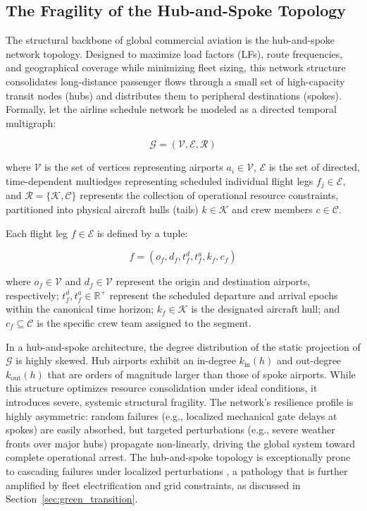 \documentclass[11pt,a4paper]{book}
\begin{document}
\subsection{The Fragility of the Hub-and-Spoke Topology}\label{sec:hub_and_spoke}

The structural backbone of global commercial aviation is the hub-and-spoke network topology. Designed to maximize load factors (LFs), route frequencies, and geographical coverage while minimizing fleet sizing, this network structure consolidates long-distance passenger flows through a small set of high-capacity transit nodes (hubs) and distributes them to peripheral destinations (spokes). Formally, let the airline schedule network be modeled as a directed temporal multigraph:

\begin{equation}
\mathcal{G} = \left(\mathcal{V}, \mathcal{E}, \mathcal{R}\right)
\end{equation}

where $\mathcal{V}$ is the set of vertices representing airports $a_i \in \mathcal{V}$, $\mathcal{E}$ is the set of directed, time-dependent multiedges representing scheduled individual flight legs $f_j \in \mathcal{E}$, and $\mathcal{R} = \{\mathcal{K}, \mathcal{C}\}$ represents the collection of operational resource constraints, partitioned into physical aircraft hulls (tails) $k \in \mathcal{K}$ and crew members $c \in \mathcal{C}$.

Each flight leg $f \in \mathcal{E}$ is defined by a tuple:

\begin{equation}
f = \left(o_f, d_f, t_f^d, t_f^a, k_f, c_f\right)
\end{equation}

where $o_f \in \mathcal{V}$ and $d_f \in \mathcal{V}$ represent the origin and destination airports, respectively; $t_f^d, t_f^a \in \mathbb{R}^+$ represent the scheduled departure and arrival epochs within the canonical time horizon; $k_f \in \mathcal{K}$ is the designated aircraft hull; and $c_f \subseteq \mathcal{C}$ is the specific crew team assigned to the segment.

In a hub-and-spoke architecture, the degree distribution of the static projection of $\mathcal{G}$ is highly skewed. Hub airports exhibit an in-degree $k_{\text{in}}(h)$ and out-degree $k_{\text{out}}(h)$ that are orders of magnitude larger than those of spoke airports. While this structure optimizes resource consolidation under ideal conditions, it introduces severe, systemic structural fragility. The network's resilience profile is highly asymmetric: random failures (e.g., localized mechanical gate delays at spokes) are easily absorbed, but targeted perturbations (e.g., severe weather fronts over major hubs) propagate non-linearly, driving the global system toward complete operational arrest. The hub-and-spoke topology is exceptionally prone to cascading failures under localized perturbations \cite{barabasi2016network, watts2002simple}, a pathology that is further amplified by fleet electrification and grid constraints, as discussed in Section~\ref{sec:green_transition}.
\end{document}
